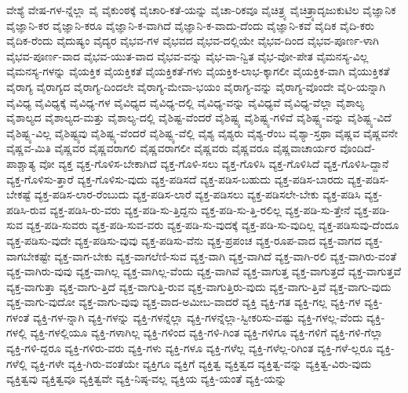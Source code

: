 {ವೇಶ್ಯೆ
ವೇಷ-ಗಳ-ನ್ನೆಲ್ಲಾ
ವೈ
ವೈಕುಂಠಕ್ಕೆ
ವೈಚಾರಿ-ಕತೆ-ಯನ್ನು
ವೈಚಾ-ರಿಕವೂ
ವೈಚಿತ್ರ್ಯ
ವೈಚಿತ್ರ್ಯಾದೃಜುಕುಟಿಲ
ವೈಜ್ಞಾನಿಕ
ವೈಜ್ಞಾನಿ-ಕರ
ವೈಜ್ಞಾನಿ-ಕರೂ
ವೈಜ್ಞಾನಿ-ಕ-ವಾಗಿದೆ
ವೈಜ್ಞಾನಿ-ಕ-ವಾದು-ದೆಂದು
ವೈಜ್ಞಾನಿ-ಕವೆ
ವೈದಿಕ
ವೈದಿ-ಕರು
ವೈದಿಕ-ರೆಂದು
ವೈದುಷ್ಯಂ
ವೈದ್ಯರ
ವೈಭವ-ಗಳ
ವೈಭವದ
ವೈಭವ-ದಲ್ಲಿಯೇ
ವೈಭವ-ದಿಂದ
ವೈಭವ-ಪೂರ್ಣ-ಳಾಗಿ
ವೈಭವ-ಪೂರ್ಣ-ವಾದ
ವೈಭವ-ಯುತ-ವಾದ
ವೈಭವ-ವನ್ನು
ವೈಭ-ವಾ-ನ್ವಿತ
ವೈಭ-ವೋ-ಪೇತ
ವೈಮನಸ್ಯ-ವಿಲ್ಲ
ವೈಮನಸ್ಯ-ಗಳನ್ನು
ವೈಯಕ್ತಿಕ
ವೈಯಕ್ತಿಕತೆ
ವೈಯಕ್ತಿಕತೆ-ಗಳು
ವೈಯಕ್ತಿಕ-ಲಾಭ-ಕ್ಕಾಗಲೀ
ವೈಯಕ್ತಿಕ-ವಾಗಿ
ವೈಯುಕ್ತಿಕತೆ
ವೈರಾಗ್ಯ
ವೈರಾಗ್ಯದ
ವೈರಾಗ್ಯ-ದಿಂದಲೇ
ವೈರಾಗ್ಯ-ಮೇವಾ-ಭಯಂ
ವೈರಾಗ್ಯ-ವನ್ನು
ವೈರಾಗ್ಯ-ವೊಂದೇ
ವೈರಿ-ಯನ್ನಾಗಿ
ವೈವಿಧ್ಯ
ವೈವಿಧ್ಯಕ್ಕೆ
ವೈವಿಧ್ಯ-ಗಳ
ವೈವಿಧ್ಯದ
ವೈವಿಧ್ಯ-ದಲ್ಲಿ
ವೈವಿಧ್ಯ-ವನ್ನು
ವೈವಿಧ್ಯವೆ
ವೈವಿಧ್ಯ-ವೆಲ್ಲಾ
ವೈಶಾಲ್ಯ
ವೈಶಾಲ್ಯದ
ವೈಶಾಲ್ಯದ-ಮತ್ತು
ವೈಶಾಲ್ಯ-ದಲ್ಲಿ
ವೈಶಿಷ್ಟ-ವೆಂದರೆ
ವೈಶಿಷ್ಟ್ಯ
ವೈಶಿಷ್ಟ್ಯ-ಗಳಿವೆ
ವೈಶಿಷ್ಟ್ಯ-ವನ್ನು
ವೈಶಿಷ್ಟ್ಯ-ವಿದೆ
ವೈಶಿಷ್ಟ್ಯ-ವಿಲ್ಲ
ವೈಶಿಷ್ಟ್ಯವು
ವೈಶಿಷ್ಟ್ಯ-ವೆಂದರೆ
ವೈಶಿಷ್ಟ್ಯ-ವೆಲ್ಲಿ
ವೈಶ್ಯ
ವೈಶ್ಯರು
ವೈಶ್ಯ-ರೆಂಬ
ವೈಶ್ಯಾ-ಸ್ತಥಾ
ವೈಷ್ಣವ
ವೈಷ್ಣವನೇ
ವೈಷ್ಣವ-ಮಿತಿ
ವೈಷ್ಣವರ
ವೈಷ್ಣವರಾಗಲಿ
ವೈಷ್ಣವರಾಗಲೀ
ವೈಷ್ಣವರು
ವೈಷ್ಣವರೂ
ವೈಷ್ಣವಾಚಾರ್ಯರ
ವೊಂದಿದೆ-ಪಾಶ್ಚಾತ್ಯ
ವೋ
ವ್ಯಕ್ತ
ವ್ಯಕ್ತ-ಗೊಳಿಸ-ಬೇಕಾಗಿದೆ
ವ್ಯಕ್ತ-ಗೊಳಿ-ಸಲು
ವ್ಯಕ್ತ-ಗೊಳಿಸಿ
ವ್ಯಕ್ತ-ಗೊಳಿಸಿದೆ
ವ್ಯಕ್ತ-ಗೊಳಿಸಿ-ದ್ದಾನೆ
ವ್ಯಕ್ತ-ಗೊಳಿಸು-ತ್ತಾರೆ
ವ್ಯಕ್ತ-ಗೊಳಿಸು-ವುದು
ವ್ಯಕ್ತ-ಪಡಿಸದೆ
ವ್ಯಕ್ತ-ಪಡಿಸ-ಬಹುದು
ವ್ಯಕ್ತ-ಪಡಿಸ-ಬಾರದು
ವ್ಯಕ್ತ-ಪಡಿಸ-ಬೇಕಷ್ಟೆ
ವ್ಯಕ್ತ-ಪಡಿಸ-ಲಾರ-ರೆಂಬುದು
ವ್ಯಕ್ತ-ಪಡಿಸ-ಲಾರೆ
ವ್ಯಕ್ತ-ಪಡಿಸಲು
ವ್ಯಕ್ತ-ಪಡಿಸಲೇ-ಬೇಕು
ವ್ಯಕ್ತ-ಪಡಿಸಿ
ವ್ಯಕ್ತ-ಪಡಿಸಿ-ರುವ
ವ್ಯಕ್ತ-ಪಡಿಸಿ-ರು-ವರು
ವ್ಯಕ್ತ-ಪಡಿ-ಸು-ತ್ತಿದ್ದನು
ವ್ಯಕ್ತ-ಪಡಿ-ಸು-ತ್ತಿ-ರಲಿಲ್ಲ
ವ್ಯಕ್ತ-ಪಡಿ-ಸು-ತ್ತೇನೆ
ವ್ಯಕ್ತ-ಪಡಿ-ಸುವ
ವ್ಯಕ್ತ-ಪಡಿ-ಸುವರು
ವ್ಯಕ್ತ-ಪಡಿ-ಸುವ-ವರು
ವ್ಯಕ್ತ-ಪಡಿ-ಸು-ವುದಕ್ಕೆ
ವ್ಯಕ್ತ-ಪಡಿ-ಸು-ವುದಿಲ್ಲ
ವ್ಯಕ್ತ-ಪಡಿಸುವು-ದೆಂದೂ
ವ್ಯಕ್ತ-ಪಡಿಸು-ವುದೇ
ವ್ಯಕ್ತ-ಪಡಿಸು-ವುವು
ವ್ಯಕ್ತ-ಪಡಿಸು-ವೆನು
ವ್ಯಕ್ತ-ಪ್ರಪಂಚ
ವ್ಯಕ್ತ-ರೂಪ-ವಾದ
ವ್ಯಕ್ತ-ವಾಗದ
ವ್ಯಕ್ತ-ವಾಗಬೇಕಷ್ಟೇ
ವ್ಯಕ್ತ-ವಾಗ-ಬೇಕು
ವ್ಯಕ್ತ-ವಾಗಲೆಣಿ-ಸುವ
ವ್ಯಕ್ತ-ವಾಗಿ
ವ್ಯಕ್ತ-ವಾಗಿದೆ
ವ್ಯಕ್ತ-ವಾಗಿ-ರಲಿ
ವ್ಯಕ್ತ-ವಾಗಿರು-ವಂತೆ
ವ್ಯಕ್ತ-ವಾಗಿರು-ವುವು
ವ್ಯಕ್ತ-ವಾಗಿಲ್ಲ
ವ್ಯಕ್ತ-ವಾಗಿಲ್ಲ-ವೆಂದು
ವ್ಯಕ್ತ-ವಾಗಿವೆ
ವ್ಯಕ್ತ-ವಾಗುತ್ತ
ವ್ಯಕ್ತ-ವಾಗುತ್ತದೆ
ವ್ಯಕ್ತ-ವಾಗುತ್ತವೆ
ವ್ಯಕ್ತ-ವಾಗುತ್ತಾ
ವ್ಯಕ್ತ-ವಾಗು-ತ್ತಿದೆ
ವ್ಯಕ್ತ-ವಾಗುತ್ತಿ-ರುವ
ವ್ಯಕ್ತ-ವಾಗುತ್ತಿರು-ವುದು
ವ್ಯಕ್ತ-ವಾಗು-ತ್ತಿವೆ
ವ್ಯಕ್ತ-ವಾಗು-ವುದು
ವ್ಯಕ್ತ-ವಾಗು-ವುದೋ
ವ್ಯಕ್ತ-ವಾಗು-ವುವು
ವ್ಯಕ್ತ-ವಾದ-ಅಮೀಬ-ವಾದರೆ
ವ್ಯಕ್ತಿ
ವ್ಯಕ್ತಿ-ಗತ
ವ್ಯಕ್ತಿ-ಗಲ್ಲ
ವ್ಯಕ್ತಿ-ಗಳ
ವ್ಯಕ್ತಿ-ಗಳಂತೆ
ವ್ಯಕ್ತಿ-ಗಳ-ನ್ನಾಗಿ
ವ್ಯಕ್ತಿ-ಗಳನ್ನು
ವ್ಯಕ್ತಿ-ಗಳನ್ನೆಲ್ಲಾ
ವ್ಯಕ್ತಿ-ಗಳನ್ನೆಲ್ಲಾ-ಸ್ವೀಕರಿಸು-ವಷ್ಟು
ವ್ಯಕ್ತಿ-ಗಳಲ್ಲ-ವೆಂದು
ವ್ಯಕ್ತಿ-ಗಳಲ್ಲಿ
ವ್ಯಕ್ತಿ-ಗಳಲ್ಲಿಯೂ
ವ್ಯಕ್ತಿ-ಗಳಾಗಿಲ್ಲ
ವ್ಯಕ್ತಿ-ಗಳಿಂದ
ವ್ಯಕ್ತಿ-ಗಳಿ-ಗಿಂತ
ವ್ಯಕ್ತಿ-ಗಳಿಗೂ
ವ್ಯಕ್ತಿ-ಗಳಿಗೆ
ವ್ಯಕ್ತಿ-ಗಳಿ-ಗೆಲ್ಲಾ
ವ್ಯಕ್ತಿ-ಗಳಿ-ದ್ದರೂ
ವ್ಯಕ್ತಿ-ಗಳಿರು-ವರು
ವ್ಯಕ್ತಿ-ಗಳು
ವ್ಯಕ್ತಿ-ಗಳೂ
ವ್ಯಕ್ತಿ-ಗಳೆಲ್ಲ
ವ್ಯಕ್ತಿ-ಗಳೆಲ್ಲ-ರಿಗಿಂತ
ವ್ಯಕ್ತಿ-ಗಳೆ-ಲ್ಲರೂ
ವ್ಯಕ್ತಿ-ಗಳೆಲ್ಲಿ
ವ್ಯಕ್ತಿ-ಗಳೇ
ವ್ಯಕ್ತಿ-ಗಿರು-ವಂತೆಯೇ
ವ್ಯಕ್ತಿಗೂ
ವ್ಯಕ್ತಿಗೆ
ವ್ಯಕ್ತಿತ್ವ
ವ್ಯಕ್ತಿತ್ವದ
ವ್ಯಕ್ತಿತ್ವ-ವನ್ನು
ವ್ಯಕ್ತಿತ್ವ-ವಿರು-ವುದು
ವ್ಯಕ್ತಿತ್ವವು
ವ್ಯಕ್ತಿತ್ವವೂ
ವ್ಯಕ್ತಿತ್ವವೇ
ವ್ಯಕ್ತಿ-ನಿಷ್ಠ-ವಲ್ಲ
ವ್ಯಕ್ತಿಯ
ವ್ಯಕ್ತಿ-ಯಂತೆ
ವ್ಯಕ್ತಿ-ಯನ್ನು
}
